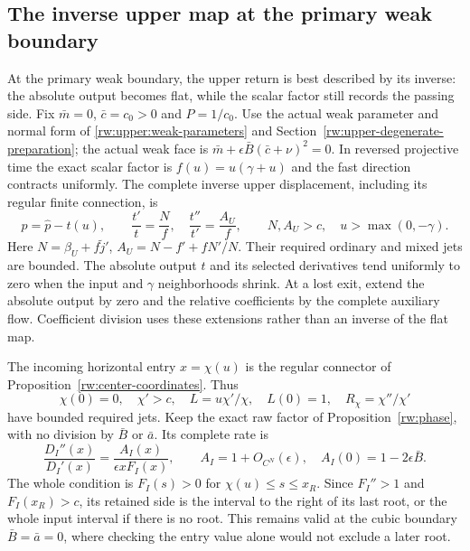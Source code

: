 \subsection{The inverse upper map at the primary weak boundary}
\label{rw:infinity:weak-section}

At the primary weak boundary, the upper return is best described by
its inverse: the absolute output becomes flat, while the scalar factor
still records the passing side. Fix $\bar m=0$, $\bar c=c_0>0$
and $P=1/c_0$.
Use the actual weak parameter and normal form of
\eqref{rw:upper:weak-parameters} and
Section~\ref{rw:upper-degenerate-preparation}; the actual weak face is
$\bar m+\epsilon\bar B(\bar c+\nu)^2=0$.
In reversed projective time the exact scalar factor is
$f(u)=u(\gamma+u)$ and the fast direction contracts uniformly.
The complete inverse upper displacement, including its regular finite
connection, is
\begin{equation}\label{rw:infinity:weak-upper}
 p=\widehat p-t(u),\qquad
 \frac{t'}t=\frac Nf,\quad \frac{t''}{t'}=\frac{A_U}f,
 \qquad N,A_U>c,\quad u>\max(0,-\gamma).
\end{equation}
Here $N=\beta_U+f\widetilde j'$, $A_U=N-f'+fN'/N$.
Their required ordinary and mixed jets are bounded. The absolute output
$t$ and its selected derivatives tend uniformly to zero when the
input and $\gamma$ neighborhoods shrink. At a lost exit, extend the
absolute output by zero and the relative coefficients by the complete auxiliary flow. Coefficient division uses
these extensions rather than an inverse of the flat map.

The incoming horizontal entry $x=\chi(u)$ is the regular connector
of Proposition~\ref{rw:center-coordinates}. Thus
\[
 \chi(0)=0,\quad\chi'>c,\quad
 L=u\chi'/\chi,\quad L(0)=1,\quad R_\chi=\chi''/\chi'
\]
have bounded required jets. Keep the exact raw factor of
Proposition~\ref{rw:phase}, with no division by $\bar B$ or
$\bar a$. Its complete rate is
\begin{equation}\label{rw:infinity:raw-horizontal}
 \frac{D_I''(x)}{D_I'(x)}
       =\frac{A_I(x)}{\epsilon xF_I(x)},\qquad
 A_I=1+O_{C^N}(\epsilon),\quad A_I(0)=1-2\epsilon\bar B.
\end{equation}
The whole condition is $F_I(s)>0$ for $\chi(u)\le s\le x_R$.
Since $F_I''>1$ and $F_I(x_R)>c$, its retained side is the interval
to the right of its last root, or the whole input interval if there
is no root. This remains valid at the cubic boundary
$\bar B=\bar a=0$, where checking the entry value alone would
not exclude a later root.

